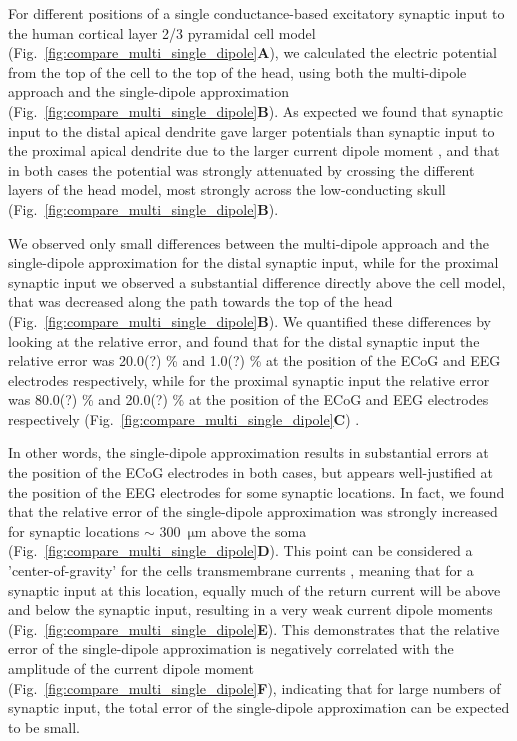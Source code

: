 \documentclass[preprint,10pt,authoryear]{elsarticle}
\newcommand{\hlg}[2][Emerald]{ {\sethlcolor{#1} \hl{#2}} }
\newcommand{\tvnnote}[1]{\color{white}{\hlg{TVN: #1 }}\color{black}}
\begin{document}
For different positions of a single conductance-based excitatory synaptic input to the human cortical layer 2/3 pyramidal cell model \citep{EYAL2016}
(Fig.~\ref{fig:compare_multi_single_dipole}\textbf{A}), we calculated the electric potential from the top of the cell to the top of the head, using both the multi-dipole approach and the single-dipole approximation (Fig.~\ref{fig:compare_multi_single_dipole}\textbf{B}). As expected we found that synaptic input to the distal apical dendrite gave larger potentials than synaptic input to the proximal apical dendrite due to the larger current dipole moment \citep{LINDEN2010, AHLFORS2015}, and that in both cases the potential was strongly attenuated by crossing the different layers of the head model, most strongly across the low-conducting skull (Fig.~\ref{fig:compare_multi_single_dipole}\textbf{B}). 

We observed only small differences between the multi-dipole approach and the single-dipole approximation for the distal synaptic input, while for the proximal synaptic input we observed a substantial difference directly above the cell model, that was decreased along the path towards the top of the head (Fig.~\ref{fig:compare_multi_single_dipole}\textbf{B}). We quantified these differences by looking at the relative error, and found that for the distal synaptic input the relative error was 20.0(?) \% and 1.0(?) \% at the position of the ECoG and EEG electrodes respectively, while for the proximal synaptic input the relative error was 80.0(?) \% and 20.0(?) \% at the position of the ECoG and EEG electrodes respectively (Fig.~\ref{fig:compare_multi_single_dipole}\textbf{C})
\tvnnote{Solveig: Can you find exact numbers here?}. 

In other words, the single-dipole approximation results in substantial errors at the position of the ECoG electrodes in both cases, but appears well-justified at the position of the EEG electrodes for some synaptic locations. In fact, we found that the relative error of the single-dipole approximation was strongly increased for synaptic locations $\sim$ 300~$\si{\um}$ above the soma (Fig.~\ref{fig:compare_multi_single_dipole}\textbf{D}). 
This point can be considered a 'center-of-gravity' for the cells transmembrane currents  \citep{LINDEN2010, AHLFORS2015}, meaning that for a synaptic input at this location, equally much of the return current will be above and below the synaptic input, resulting in a very weak current dipole moments (Fig.~\ref{fig:compare_multi_single_dipole}\textbf{E}).
This demonstrates that the relative error of the single-dipole approximation is negatively correlated with the amplitude of the current dipole moment (Fig.~\ref{fig:compare_multi_single_dipole}\textbf{F}), indicating that for large numbers of synaptic input, the total error of the single-dipole approximation can be expected to be small.
\end{document}
